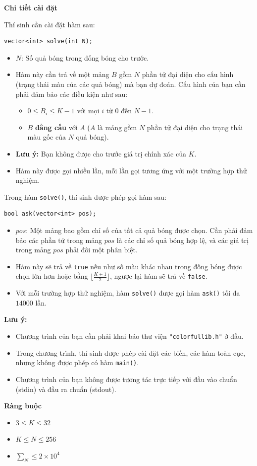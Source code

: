 \textbf{Chi tiết cài đặt}

Thí sinh cần cài đặt hàm sau:

\begin{lstlisting}
vector<int> solve(int N);
\end{lstlisting}

\begin{itemize}
   \item $N$: Số quả bóng trong đống bóng cho trước.
   \item Hàm này cần trả về một mảng $B$ gồm $N$ phần tử đại diện cho cấu hình (trạng thái màu của các quả bóng) mà bạn dự đoán. Cấu hình của bạn cần phải đảm bảo các điều kiện như sau:
   \begin{itemize}
      \item $0\le B_i\le K-1$ với mọi $i$ từ $0$ đến $N-1$.
      \item $B$ \textbf{đẳng cấu} với $A$ ($A$ là mảng gồm $N$ phần tử đại diện cho trạng thái màu gốc của $N$ quả bóng).
   \end{itemize}
   \item \textbf{Lưu ý:} Bạn không được cho trước giá trị chính xác của $K$.
   \item Hàm này được gọi nhiều lần, mỗi lần gọi tương ứng với một trường hợp thử nghiệm.
\end{itemize}

Trong hàm \texttt{solve()}, thí sinh được phép gọi hàm sau:

\begin{lstlisting}
bool ask(vector<int> pos);
\end{lstlisting}

\begin{itemize}
   \item $pos$: Một mảng bao gồm chỉ số của tất cả quả bóng được chọn. Cần phải đảm bảo các phần tử trong mảng $pos$ là các chỉ số quả bóng hợp lệ, và các giá trị trong mảng $pos$ phải đôi một phân biệt.
   \item Hàm này sẽ trả về \texttt{true} nếu như số màu khác nhau trong đống bóng được chọn lớn hơn hoặc bằng $\lfloor \frac{K+1}2\rfloor$, ngược lại hàm sẽ trả về \texttt{false}.
   \item Với mỗi trường hợp thử nghiệm, hàm \texttt{solve()} được gọi hàm \texttt{ask()} tối đa $14000$ lần.
\end{itemize}

\textbf{Lưu ý:}
\begin{itemize}
   \item Chương trình của bạn cần phải khai báo thư viện \texttt{"colorfullib.h"} ở đầu.
   \item Trong chương trình, thí sinh được phép cài đặt các biến, các hàm toàn cục, nhưng không được phép có hàm \texttt{main()}.
   \item Chương trình của bạn không được tương tác trực tiếp với đầu vào chuẩn (stdin) và đầu ra chuẩn (stdout).
\end{itemize}

\textbf{Ràng buộc}

\begin{itemize}
   \item $3\le K\le 32$
   \item $K\le N\le 256$
   \item $\sum_N\le 2\times 10^4$
\end{itemize}